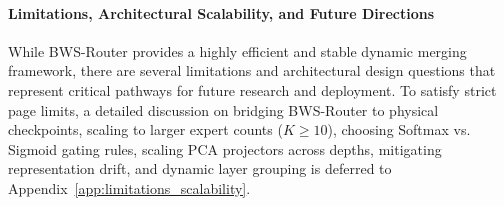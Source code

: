 \paragraph{Limitations, Architectural Scalability, and Future Directions}
While BWS-Router provides a highly efficient and stable dynamic merging framework, there are several limitations and architectural design questions that represent critical pathways for future research and deployment. To satisfy strict page limits, a detailed discussion on bridging BWS-Router to physical checkpoints, scaling to larger expert counts ($K \ge 10$), choosing Softmax vs. Sigmoid gating rules, scaling PCA projectors across depths, mitigating representation drift, and dynamic layer grouping is deferred to Appendix~\ref{app:limitations_scalability}.
